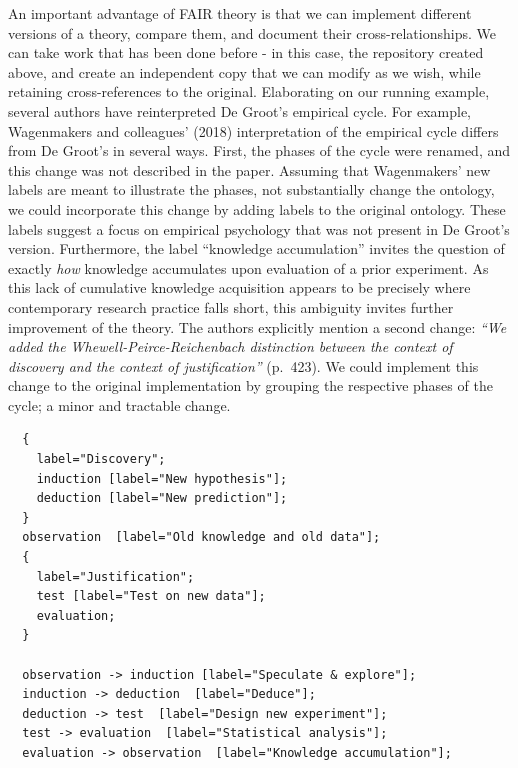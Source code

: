 \documentclass[
  man, noextraspace,floatsintext]{apa7}
\begin{document}
An important advantage of FAIR theory is that we can implement different versions of a theory, compare them, and document their cross-relationships.
We can take work that has been done before - in this case, the repository created above, and create an independent copy that we can modify as we wish, while retaining cross-references to the original.
Elaborating on our running example, several authors have reinterpreted De Groot's empirical cycle.
For example, Wagenmakers and colleagues' (2018) interpretation of the empirical cycle differs from De Groot's in several ways.
First, the phases of the cycle were renamed, and this change was not described in the paper.
Assuming that Wagenmakers' new labels are meant to illustrate the phases,
not substantially change the ontology,
we could incorporate this change by adding labels to the original ontology.
These labels suggest a focus on empirical psychology that was not present in De Groot's version.
Furthermore, the label ``knowledge accumulation'' invites the question of exactly \emph{how} knowledge accumulates upon evaluation of a prior experiment.
As this lack of cumulative knowledge acquisition appears to be precisely where contemporary research practice falls short, this ambiguity invites further improvement of the theory.
The authors explicitly mention a second change: \emph{``We added the Whewell-Peirce-Reichenbach distinction between the context of discovery and the context of justification''} (p.~423).
We could implement this change to the original implementation by grouping the respective phases of the cycle;
a minor and tractable change.

\begin{verbatim}
  {
    label="Discovery";
    induction [label="New hypothesis"];
    deduction [label="New prediction"];
  }
  observation  [label="Old knowledge and old data"];
  {
    label="Justification";
    test [label="Test on new data"];
    evaluation;
  }

  observation -> induction [label="Speculate & explore"];
  induction -> deduction  [label="Deduce"];
  deduction -> test  [label="Design new experiment"];
  test -> evaluation  [label="Statistical analysis"];
  evaluation -> observation  [label="Knowledge accumulation"];
\end{verbatim}
\end{document}

